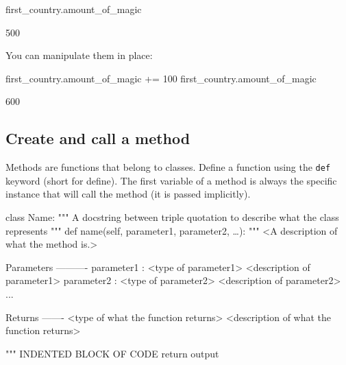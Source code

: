 \begin{pyin}
first_country.amount_of_magic
\end{pyin}





\begin{raw}
500
\end{raw}





You can manipulate them in place:




\begin{pyin}
first_country.amount_of_magic += 100
first_country.amount_of_magic
\end{pyin}





\begin{raw}
600
\end{raw}





\subsection{Create and call a method}
\label{\detokenize{building-tools/03-objects/how/main:how-to-create-and-call-a-method}}

Methods are functions that belong to classes. Define a function using the
\texttt{def} keyword (short for define). The first variable of a method is always the
specific instance that will call the method (it is passed implicitly).


\begin{api}
class Name:
    """
    A docstring between triple quotation to describe what the class represents
    """
    def name(self, parameter1, parameter2, …):
        """
        <A description of what the method is.>

        Parameters
        ----------
        parameter1 : <type of parameter1>
            <description of parameter1>
        parameter2 : <type of parameter2>
            <description of parameter2>
        ...

        Returns
        -------
        <type of what the function returns>
            <description of what the function returns>

        """
        INDENTED BLOCK OF CODE
        return output
\end{api}



